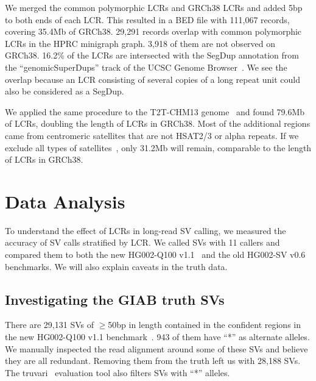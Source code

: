 \documentclass[a4paper,num-refs]{oup-contemporary}
\begin{document}
We merged the common polymorphic LCRs and GRCh38 LCRs and added 5bp to both ends of each LCR.
This resulted in a BED file with 111,067 records, covering 35.4Mb of GRCh38.
29,291 records overlap with common polymorphic LCRs in the HPRC minigraph graph.
3,918 of them are not observed on GRCh38.
16.2\% of the LCRs are intersected with the SegDup annotation from the ``genomicSuperDups'' track of the UCSC Genome Browser~\cite{Perez:2025aa}.
We see the overlap because an LCR consisting of several copies of a long repeat unit could also be considered as a SegDup.

We applied the same procedure to the T2T-CHM13 genome~\cite{Nurk:2022up}
and found 79.6Mb of LCRs, doubling the length of LCRs in GRCh38.
Most of the additional regions came from centromeric satellites that are not HSAT2/3 or alpha repeats.
If we exclude all types of satellites~\cite{Altemose:2022tv}, only 31.2Mb will remain,
comparable to the length of LCRs in GRCh38.

\section{Data Analysis}

To understand the effect of LCRs in long-read SV calling,
we measured the accuracy of SV calls stratified by LCR.
We called SVs with 11 callers and compared them to both the new HG002-Q100 v1.1~\cite{Hansen2025.09.21.677443}
and the old HG002-SV v0.6~\cite{Zook:2020aa} benchmarks.
We will also explain caveats in the truth data.

\subsection{Investigating the GIAB truth SVs}

There are 29,131 SVs of $\ge$50bp in length contained in the confident regions in the new HG002-Q100 v1.1 benchmark~\cite{Hansen2025.09.21.677443}.
943 of them have ``*'' as alternate alleles.
We manually inspected the read alignment around some of these SVs and believe they are all redundant.
Removing them from the truth left us with 28,188 SVs.
The truvari~\cite{English:2022aa} evaluation tool also filters SVs with ``*'' alleles.
\end{document}
